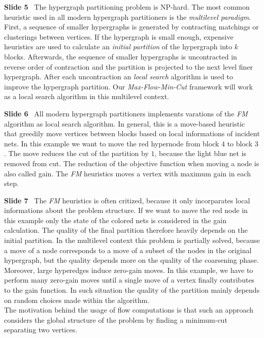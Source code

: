 \documentclass[11pt]{llncs}
\newcommand{\fakepar}[1]{\medskip\par\textbf{#1}\ }
\begin{document}
\fakepar{Slide 5} The hypergraph partitioning problem is NP-hard. The most common
heuristic used in all modern hypergraph partitioners is the \emph{multilevel paradigm}.
First, a sequence of smaller hypergraphs is generated by contracting matchings or clusterings
between vertices. If the hypergraph is small enough, expensive heuristics are used
to calculate an \emph{initial partition} of the hypergraph into $k$ blocks. Afterwards,
the sequence of smaller hypergraphs is uncontracted in reverse order of contraction and
the partition is projected to the next level finer hypergraph. After each uncontraction
an \emph{local search} algorithm is used to improve the hypergraph partition. Our 
\emph{Max-Flow-Min-Cut} framework will work as a local search algorithm in this multilevel
context.

\fakepar{Slide 6} All modern hypergraph partitioners implements varations of the \emph{FM}
algorithm as local search algorithm. In general, this is a move-based heuristic that greedily move vertices between blocks
based on local informations of incident nets. In this example we want to move the red hypernode 
from block $4$ to block $3$. The move reduces the cut of the partition by $1$, because the light
blue net is removed from cut. The reduction of the objective function when moving a node is also
called gain. The \emph{FM} heuristics moves a vertex with maximum gain in each step.

\fakepar{Slide 7} The \emph{FM} heuristics is often critized, because it only incorparates local
informations about the problem structure. If we want to move the red node in this example only
the state of the colored nets is considered in the gain calculation. The quality of the final partition
therefore heavily depends on the initial partition. In the multilevel context this problem is 
partially solved, because a move of a node corresponds to a move of a subset of the nodes in the
original hypergraph, but the quality depends more on the quality of the coarsening phase.\\
Moreover, large hyperedges induce zero-gain moves. In this example, we have to perform many zero-gain
moves until a single move of a vertex finally contributes to the gain function. In such situation
the quality of the partition mainly depends on random choices made within the algorithm. \\
The motivation behind the usage of flow computations is that such an approach considers the global
structure of the problem by finding a minimum-cut separating two vertices.
\end{document}
